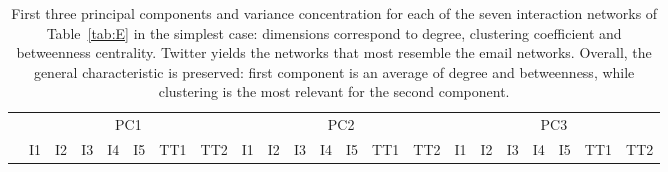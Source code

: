 \documentclass[%
 aip,
 jmp,%
 amsmath,amssymb,
 reprint,%
 floatfix,
]{revtex4-1}
\begin{document}
\begin{table}[!h]
	\caption{First three principal components and variance concentration for each of the seven interaction networks of Table~\ref{tab:E} in the simplest case: dimensions correspond to degree, clustering coefficient and betweenness centrality. Twitter yields the networks that most resemble the email networks. Overall, the general characteristic is preserved: first component is an average of degree and betweenness, while clustering is the most relevant for the second component.}
	\footnotesize
	\begin{center}
		\begin{tabular}{| l ||  c |c |c |c |c | c | c || c | c | c | c | c | c | c || c |c |c |c |c | c | c |	}\cline{2-22}
			\multicolumn{1}{c|}{} & \multicolumn{7}{c||}{PC1}          & \multicolumn{7}{c||}{PC2} & \multicolumn{7}{c|}{PC3}  \\\cline{2-22}
			\multicolumn{1}{c|}{} & 
			I1 & I2 & I3 & I4 & I5 & TT1 & TT2 &
			I1 & I2 & I3 & I4 & I5 & TT1 & TT2 &
			I1 & I2 & I3 & I4 & I5 & TT1 & TT2 \\\hline
			
			\hline
		\end{tabular}
	\end{center}
	\label{tab:pcaE1I}
\end{table}
\end{document}
